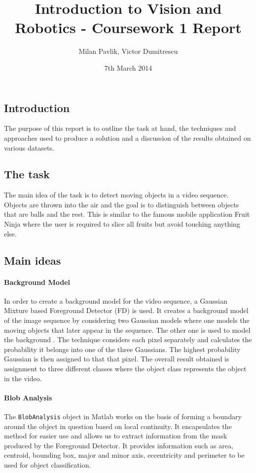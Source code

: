 \documentclass[10pt,a4paper]{article}
\title{Introduction to Vision and Robotics - Coursework 1 Report}
\author{Milan Pavlik, Victor Dumitrescu}
\date{7th March 2014}
\begin{document}
\maketitle  %
%

\begin{multicols}{2}

\section{Introduction}

The purpose of this report is to outline the task at hand, the techniques and approaches used to produce a solution and a discussion of the results obtained on various datasets.

\subsection{The task}

The main idea of the task is to detect moving objects in a video sequence. Objects are thrown into the air and the goal is to distinguish between objects that are balls and the rest. This is similar to the famous mobile application Fruit Ninja where the user is required to slice all fruits but avoid touching anything else.



\subsection{Main ideas}

\paragraph{Background Model}
In order to create a background model for the video sequence, a Gaussian Mixture based Foreground Detector (FD) is used. It creates a background model of the image sequence by considering two Gaussian models where one models the moving objects that later appear in the sequence. The other one is used to model the background \cite{ES1}.
The technique considers each pixel separately and calculates the probability it belongs into one of the three Gaussians. The highest probability Gaussian is then assigned to that that pixel. The overall result obtained is assignment to three different classes where the object class represents the object in the video. 

\paragraph{Blob Analysis}
The \texttt{BlobAnalysis} object in Matlab works on the basis of forming a boundary around the object in question based on local continuity. It encapsulates the method for easier use and allows us to extract information from the mask produced by the Foreground Detector. It provides information such as area, centroid, bounding box, major and minor axis, eccentricity and perimeter to be used for object classification.


\end{multicols}
\end{document}
